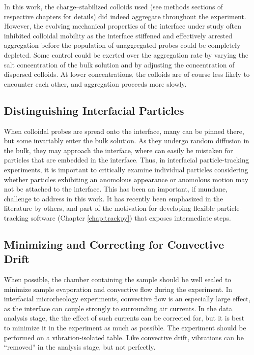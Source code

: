 In this work, the charge--stabilized colloids used (see methods sections of respective chapters for details) did indeed aggregate throughout the experiment. However, the evolving mechanical properties of the interface under study often inhibited colloidal mobility as the interface stiffened and effectively arrested aggregation before the population of unaggregated probes could be completely depleted. Some control could be exerted over the aggregation rate by varying the salt concentration of the bulk solution and by adjusting the concentration of dispersed colloids. At lower concentrations, the colloids are of course less likely to encounter each other, and aggregation proceeds more slowly.

\subsection{Distinguishing Interfacial Particles}

When colloidal probes are spread onto the interface, many can be pinned there, but some invariably enter the bulk solution. As they undergo random diffusion in the bulk, they may approach the interface, where can easily be mistaken for particles that are embedded in the interface. Thus, in interfacial particle-tracking experiments, it is important to critically examine individual particles considering whether particles exhibiting an anomolous appearance or anomolous motion may not be attached to the interface. This has been an important, if mundane, challenge to address in this work. It has recently been emphasized in the literature by others\cite{Samaniuk2014}, and part of the motivation for developing flexible particle-tracking software (Chapter \ref{chap:trackpy}) that exposes intermediate steps.

\subsection{Minimizing and Correcting for Convective Drift}

When possible, the chamber containing the sample should be well sealed to minimize sample evaporation and convective flow during the experiment\cite{Savin2005}. In interfacial microrheology experiments, convective flow is an especially large effect, as the interface can couple strongly to surrounding air currents. In the data analysis stage, the the effect of such currents can be corrected for\cite{Crocker2007}, but it is best to minimize it in the experiment as much as possible. The experiment should be performed on a vibration-isolated table. Like convective drift, vibrations can be ``removed'' in the analysis stage, but not perfectly.

